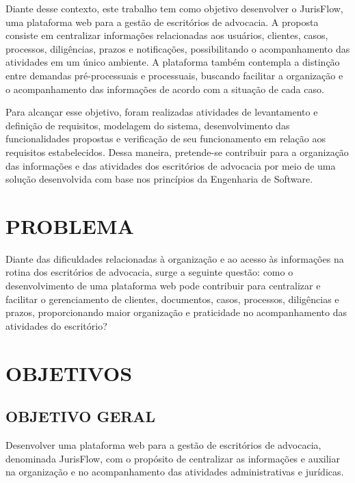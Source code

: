 Diante desse contexto, este trabalho tem como objetivo desenvolver o JurisFlow, uma plataforma web para a gestão de escritórios de advocacia. A proposta consiste em centralizar informações relacionadas aos usuários, clientes, casos, processos, diligências, prazos e notificações, possibilitando o acompanhamento das atividades em um único ambiente. A plataforma também contempla a distinção entre demandas pré-processuais e processuais, buscando facilitar a organização e o acompanhamento das informações de acordo com a situação de cada caso.

Para alcançar esse objetivo, foram realizadas atividades de levantamento e definição de requisitos, modelagem do sistema, desenvolvimento das funcionalidades propostas e verificação de seu funcionamento em relação aos requisitos estabelecidos. Dessa maneira, pretende-se contribuir para a organização das informações e das atividades dos escritórios de advocacia por meio de uma solução desenvolvida com base nos princípios da Engenharia de Software.
 
\section{PROBLEMA}
Diante das dificuldades relacionadas à organização e ao acesso às informações na rotina dos escritórios de advocacia, surge a seguinte questão: como o desenvolvimento de uma plataforma web pode contribuir para centralizar e facilitar o gerenciamento de clientes, documentos, casos, processos, diligências e prazos, proporcionando maior organização e praticidade no acompanhamento das atividades do escritório?

\section{OBJETIVOS}
\subsection{OBJETIVO GERAL}
Desenvolver uma plataforma web para a gestão de escritórios de advocacia, denominada JurisFlow, com o propósito de centralizar as informações e auxiliar na organização e no acompanhamento das atividades administrativas e jurídicas.


